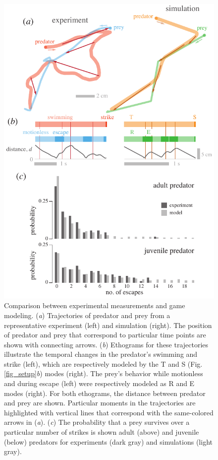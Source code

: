 \documentclass[]{rsos}%
\begin{document}
\pagebreak

\begin{figure}[!h]
\centering
	\includegraphics[width=4.5in]{fig_trajectories}
\caption{
Comparison between experimental measurements and game modeling. 
(\textit{a}) Trajectories of predator and prey from a representative experiment (left) and simulation (right). 
The position of predator and prey that correspond to particular time points are shown with connecting arrows.
(\textit{b}) Ethograms for these trajectories illustrate the temporal changes in the predator's swimming and strike (left), which are respectively modeled by the T and S (Fig. \ref{fig_setup}\textit{b}) modes (right). 
The prey's behavior while motionless and during escape (left) were respectively modeled as R and E modes (right).
For both ethograms, the distance between predator and prey are shown.
Particular moments in the trajectories are highlighted with vertical lines that correspond with the same-colored arrows in (\textit{a}).
(\textit{c}) The probability that a prey survives over a particular number of strikes is shown adult  (above) and juvenile (below) predators for experiments (dark gray) and simulations (light gray).   
}
\label{fig_traj}
\end{figure}
\end{document}
